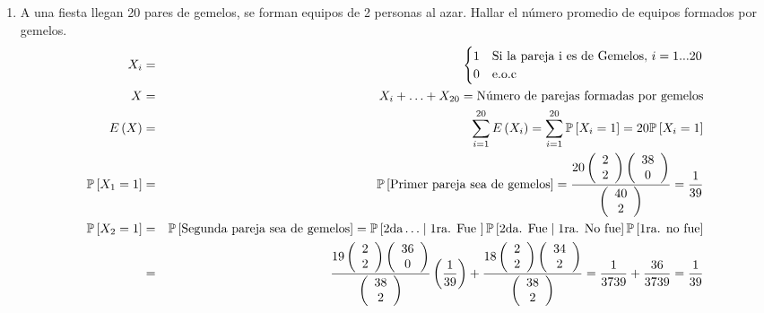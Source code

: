 \begin{enumerate}
\item A una fiesta llegan 20 pares de gemelos, se forman equipos de 2 personas al azar. Hallar el número promedio de equipos formados por gemelos.     
\begin{eqnarray*}  
X_{i}&=&  \begin{cases}
1 & \textrm{Si la pareja i es de Gemelos}, \, i= 1... 20 \\
0 & \textrm{e.o.c}
\end{cases}\\   
X &=& X_{i}+ \ldots + X_{20}= \textrm{Número de parejas formadas por gemelos} \\
E \left(X \right) &=& \sum_{i=1}^{20} E \left(X_{i} \right) = \sum_{i=1}^{20} \mathbb{P} \left[ X_{i}= 1 \right]= 20 \mathbb{P} \left[X_{i}=1 \right]\\
\mathbb{P} \left[ X_{1} = 1 \right] &=& \mathbb{P} \left[ \textrm{Primer pareja sea de gemelos} \right] = \dfrac{20 \left(\begin{array}{c} 2 \\2\end{array} \right)\left(\begin{array}{c} 38 \\0\end{array}  \right)}{\left(\begin{array}{c} 40 \\2\end{array} \right)} = \frac{1}{39} \\
\mathbb{P} \left[ X_{2}=1 \right]&=& \mathbb{P} \left[ \textrm{Segunda pareja sea de gemelos} \right]= \mathbb{P} \left[\textrm{2da}\ldots \mid \textrm{1ra. Fue }\right] \mathbb{P} \left[\textrm{2da. Fue}\mid \textrm{1ra. No fue} \right]\mathbb{P} \left[ \textrm{1ra. no fue} \right]\\
&=& \dfrac{19 \left( \begin{array}{c} 2 \\2\end{array} \right) \left(\begin{array}{c} 36 \\0 \end{array} \right)}{\left( \begin{array}{c} 38 \\2\end{array} \right)} \left( \frac{1}{39} \right)+ \dfrac{18 \left(\begin{array}{c} 2 \\2\end{array} \right) \left( \begin{array}{c} 34 \\2\end{array} \right)}{\left(\begin{array}{c} 38 \\2\end{array} \right) }= \frac{1}{3739}+ \frac{36}{3739} = \frac{1}{39}
\end{eqnarray*}


\end{enumerate}
